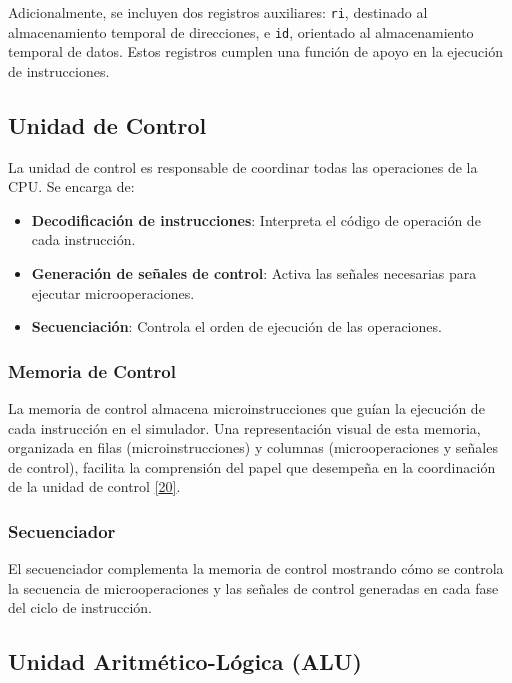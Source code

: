 \documentclass[12pt,oneside]{templates/unerthesis}
\providecommand{\tightlist}{%
  \setlength{\itemsep}{0pt}\setlength{\parskip}{0pt}}
\begin{document}
Adicionalmente, se incluyen dos registros auxiliares: \texttt{ri}, destinado al almacenamiento temporal de direcciones, e \texttt{id}, orientado al almacenamiento temporal de datos. Estos registros cumplen una función de apoyo en la ejecución de instrucciones.

\hypertarget{unidad-de-control}{%
\subsection{Unidad de Control}\label{unidad-de-control}}

La unidad de control es responsable de coordinar todas las operaciones de la CPU. Se encarga de:

\begin{itemize}
\tightlist
\item
  \textbf{Decodificación de instrucciones}: Interpreta el código de operación de cada instrucción.
\item
  \textbf{Generación de señales de control}: Activa las señales necesarias para ejecutar microoperaciones.
\item
  \textbf{Secuenciación}: Controla el orden de ejecución de las operaciones.
\end{itemize}

\hypertarget{memoria-de-control}{%
\subsubsection{Memoria de Control}\label{memoria-de-control}}

La memoria de control almacena microinstrucciones que guían la ejecución de cada instrucción en el simulador. Una representación visual de esta memoria, organizada en filas (microinstrucciones) y columnas (microoperaciones y señales de control), facilita la comprensión del papel que desempeña en la coordinación de la unidad de control \protect\hyperlink{ref-stallings_computer_2021}{{[}20{]}}.

\hypertarget{secuenciador}{%
\subsubsection{Secuenciador}\label{secuenciador}}

El secuenciador complementa la memoria de control mostrando cómo se controla la secuencia de microoperaciones y las señales de control generadas en cada fase del ciclo de instrucción.

\hypertarget{unidad-aritmuxe9tico-luxf3gica-alu}{%
\subsection{Unidad Aritmético-Lógica (ALU)}\label{unidad-aritmuxe9tico-luxf3gica-alu}}
\end{document}
